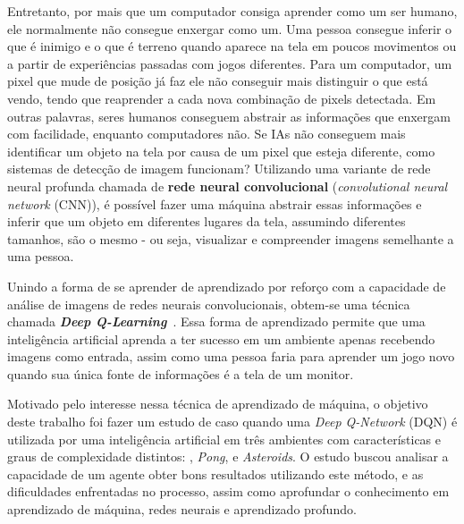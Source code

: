 Entretanto, por mais que um computador consiga aprender como um ser humano, ele normalmente não consegue enxergar como um.
Uma pessoa consegue inferir o que é inimigo e o que é terreno quando aparece na tela em poucos movimentos ou a partir de experiências passadas com jogos diferentes.
Para um computador, um pixel que mude de posição já faz ele não conseguir mais distinguir o que está vendo, tendo que reaprender a cada nova combinação de pixels detectada.
Em outras palavras, seres humanos conseguem abstrair as informações que enxergam com facilidade, enquanto computadores não.
Se IAs não conseguem mais identificar um objeto na tela por causa de um pixel que esteja diferente, como sistemas de detecção de imagem funcionam?
Utilizando uma variante de rede neural profunda chamada de \textbf{rede neural convolucional} (\textit{convolutional neural network} (CNN)), é possível fazer uma máquina abstrair essas informações e inferir que um objeto em diferentes lugares da tela, assumindo diferentes tamanhos, são o mesmo - ou seja, visualizar e compreender imagens semelhante a uma pessoa.

Unindo a forma de se aprender de aprendizado por reforço com a capacidade de análise de imagens de redes neurais convolucionais, obtem-se uma técnica chamada \textit{\textbf{Deep Q-Learning}}~\cite{DBLP:journals/corr/MnihKSGAWR13}.
Essa forma de aprendizado permite que uma inteligência artificial aprenda a ter sucesso em um ambiente apenas recebendo imagens como entrada, assim como uma pessoa faria para aprender um jogo novo quando sua única fonte de informações é a tela de um monitor.

Motivado pelo interesse nessa técnica de aprendizado de máquina, o objetivo deste trabalho foi fazer um estudo de caso quando uma \textit{Deep Q-Network} (DQN) é utilizada por uma inteligência artificial em três ambientes com características e graus de complexidade distintos: , \textit{Pong}, e \textit{Asteroids}.
O estudo buscou analisar a capacidade de um agente obter bons resultados utilizando este método, e as dificuldades enfrentadas no processo, assim como aprofundar o conhecimento em aprendizado de máquina, redes neurais e aprendizado profundo.

